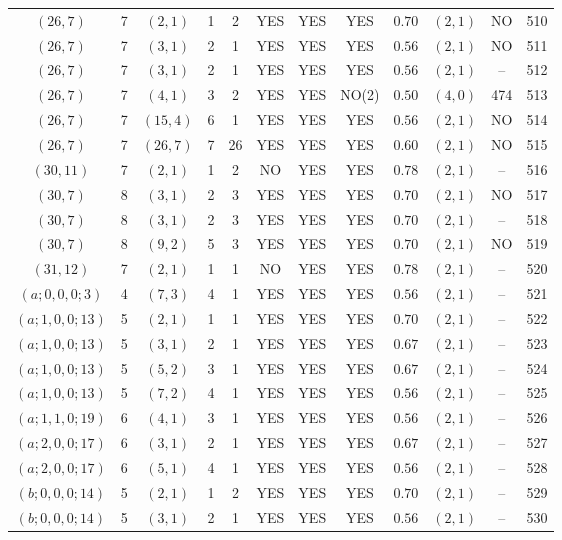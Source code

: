 \begin{longtable}{|c|c|c|c|c|c|c|c|c|c|c|c|}
$(26,7)$ & 7 & $(2,1)$ & 1 & 2 & YES & YES & YES & $0.70$ & $(2,1)$ & NO & 510\\
$(26,7)$ & 7 & $(3,1)$ & 2 & 1 & YES & YES & YES & $0.56$ & $(2,1)$ & NO & 511\\
$(26,7)$ & 7 & $(3,1)$ & 2 & 1 & YES & YES & YES & $0.56$ & $(2,1)$ & -- & 512\\
$(26,7)$ & 7 & $(4,1)$ & 3 & 2 & YES & YES & NO(2) & $0.50$ & $(4,0)$ & 474 & 513\\
$(26,7)$ & 7 & $(15,4)$ & 6 & 1 & YES & YES & YES & $0.56$ & $(2,1)$ & NO & 514\\
$(26,7)$ & 7 & $(26,7)$ & 7 & 26 & YES & YES & YES & $0.60$ & $(2,1)$ & NO & 515\\
$(30,11)$ & 7 & $(2,1)$ & 1 & 2 & NO & YES & YES & $0.78$ & $(2,1)$ & -- & 516\\
$(30,7)$ & 8 & $(3,1)$ & 2 & 3 & YES & YES & YES & $0.70$ & $(2,1)$ & NO & 517\\
$(30,7)$ & 8 & $(3,1)$ & 2 & 3 & YES & YES & YES & $0.70$ & $(2,1)$ & -- & 518\\
$(30,7)$ & 8 & $(9,2)$ & 5 & 3 & YES & YES & YES & $0.70$ & $(2,1)$ & NO & 519\\
$(31,12)$ & 7 & $(2,1)$ & 1 & 1 & NO & YES & YES & $0.78$ & $(2,1)$ & -- & 520\\
$(a;0,0,0;3)$ & 4 & $(7,3)$ & 4 & 1 & YES & YES & YES & $0.56$ & $(2,1)$ & -- & 521\\
$(a;1,0,0;13)$ & 5 & $(2,1)$ & 1 & 1 & YES & YES & YES & $0.70$ & $(2,1)$ & -- & 522\\
$(a;1,0,0;13)$ & 5 & $(3,1)$ & 2 & 1 & YES & YES & YES & $0.67$ & $(2,1)$ & -- & 523\\
$(a;1,0,0;13)$ & 5 & $(5,2)$ & 3 & 1 & YES & YES & YES & $0.67$ & $(2,1)$ & -- & 524\\
$(a;1,0,0;13)$ & 5 & $(7,2)$ & 4 & 1 & YES & YES & YES & $0.56$ & $(2,1)$ & -- & 525\\
$(a;1,1,0;19)$ & 6 & $(4,1)$ & 3 & 1 & YES & YES & YES & $0.56$ & $(2,1)$ & -- & 526\\
$(a;2,0,0;17)$ & 6 & $(3,1)$ & 2 & 1 & YES & YES & YES & $0.67$ & $(2,1)$ & -- & 527\\
$(a;2,0,0;17)$ & 6 & $(5,1)$ & 4 & 1 & YES & YES & YES & $0.56$ & $(2,1)$ & -- & 528\\
$(b;0,0,0;14)$ & 5 & $(2,1)$ & 1 & 2 & YES & YES & YES & $0.70$ & $(2,1)$ & -- & 529\\
$(b;0,0,0;14)$ & 5 & $(3,1)$ & 2 & 1 & YES & YES & YES & $0.56$ & $(2,1)$ & -- & 530\\

\end{longtable}

